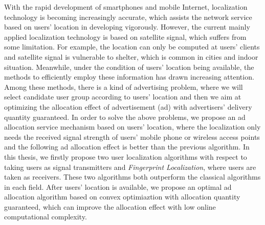 \begin{eabstract}
   With the rapid development of smartphones and mobile Internet, localization technology is becoming increasingly accurate, which assists the network service based on users' location in developing vigorously. However, the current mainly applied localization technology is based on satellite signal, which suffers from some limitation. For example, the location can only be computed at users' clients and satellite signal is vulnerable to shelter, which is common in cities and indoor situation. Meanwhile, under the condition of users' location being available, the methods to efficiently employ these information  has drawn increasing attention. Among these methods, there is a kind of advertising problem, where we will select candidate user group according to users' location and then we aim at optimizing the allocation effect of advertisement (ad) with advertisers' delivery quantity guaranteed. In order to solve the above problems, we propose an ad allocation service mechanism based on users' location, where the localization only needs the received signal strength of users' mobile phone or wireless access points and the following ad allocation effect is better than the previous algorithm. In this thesis, we firstly propose two user localization algorithms with respect to taking users as signal transmitters and \textit{Fingerprint Localization}, where users are taken as receivers. These two algorithms both outperform the classical algorithms in each field. After users' location is available, we propose an optimal ad allocation algorithm based on convex optimiaztion with allocation quantity guaranteed, which can improve the allocation effect with low online computational complexity. 
   

\end{eabstract}
